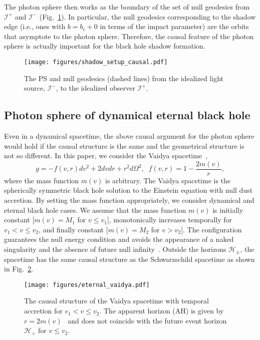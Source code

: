 \documentclass[prd,showpacs,preprintnumbers,groupedaddress,superscriptaddress,nofootinbib,11pt]{revtex4-1} %
\theoremstyle{newplain}
\begin{document}
The photon sphere then works as the boundary of the set of null geodesics from $\mathscr{I}^+$ and $\mathscr{I}^-$ (Fig.~\ref{fig:shadow-setup-causal}).
In particular, the null geodesics corresponding to the shadow edge (i.e., ones with $b=b_\text{c}+0$ in terms of the impact parameter) are the orbits that asymptote to the photon sphere.
Therefore, the causal feature of the photon sphere is actually important for the black hole shadow formation.
\begin{figure}[h]
\texttt{[image: figures/shadow\_setup\_causal.pdf]}
\caption{\label{fig:shadow-setup-causal}
The PS and null geodesics (dashed lines) from the idealized light source, $\mathscr{I}^-$, to the idealized observer $\mathscr{I}^+$.
}
\end{figure}


\subsection{Photon sphere of dynamical eternal black hole}
Even in a dynamical spacetime, the above causal argument for the photon sphere would hold if the causal structure is the same and the geometrical structure is not so different.
In this paper, we consider the Vaidya spacetime~\cite{Vaidya_1951},
\begin{equation}
g=-f(v,r)dv^2+2dvdr+r^2d\Omega^2,\;\; f(v,r)=1-\frac{2m(v)}{r},
\label{eq:vaidyametric}
\end{equation}
where the mass function $m(v)$ is arbitrary.
The Vaidya spacetime is the spherically symmetric black hole solution to the Einstein equation with null dust accretion.
By setting the mass function appropriately, we consider dynamical and eternal black hole cases.
We assume that the mass function $m(v)$ is initially constant [$m(v)=M_1$ for $v\le v_1$], monotonically increases temporally for $v_1<v\le v_2$, and finally constant [$m(v)=M_2$ for $v>v_2$].
The configuration guarantees the null energy condition and avoids the appearance of a naked singularity and the absence of future null infinity~\cite{Hiscock_1982,Kuroda_1984}.
Outside the horizons $\mathscr{H}_\pm$, the spacetime has the same causal structure as the Schwarzschild spacetime as shown in Fig.~\ref{fig:eternal-vaidya}.
\begin{figure}[h]
\texttt{[image: figures/eternal\_vaidya.pdf]}
\caption{\label{fig:eternal-vaidya}
The causal structure of the Vaidya spacetime with temporal accretion for $v_1<v\le v_2$.
The apparent horizon (AH) is given by $r=2m(v)$~\cite{nielsen} and does not coincide with the future event horizon $\mathscr{H}_+$ for $v\le v_2$.
}
\end{figure}
\end{document}
